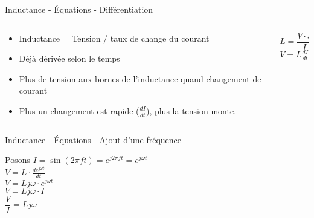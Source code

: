 \begin{frame}{Inductance - Équations - Différentiation}
    \begin{columns}
        \begin{column}{0.5\textwidth}
            \begin{itemize}
                \item Inductance = Tension / taux de change du courant
                \item Déjà dérivée selon le temps
                \bigskip
                \item Plus de tension aux bornes de l'inductance quand changement de courant
                \item Plus un changement est rapide ($\frac{dI}{dt}$), plus la tension monte.
            \end{itemize}
        \end{column}
        \begin{column}{0.5\textwidth}
            \Large{
            \begin{center}
                $L = \dfrac{V \cdot s}{I}$\\
                \vspace{10pt}
                $V = L \frac{dI}{dt}$\\
            \end{center}
            }
        \end{column}
    \end{columns}
\end{frame}

\begin{frame}{Inductance - Équations - Ajout d'une fréquence}
    \begin{center}
        \Large{
            Posons $I = \sin(2 \pi f t) = e^{j 2 \pi f t} = e^{j \omega t}$\\
            \vspace{15pt}
            $V = L \cdot \frac{de^{j \omega t}}{dt}$\\
            \vspace{5pt}
            $V = L j \omega \cdot e^{j \omega t}$\\
            \vspace{5pt}
            $V = L j \omega \cdot I$\\
            \vspace{20pt}
            $\dfrac{V}{I} = L j \omega$\\
        }
    \end{center}
\end{frame}

